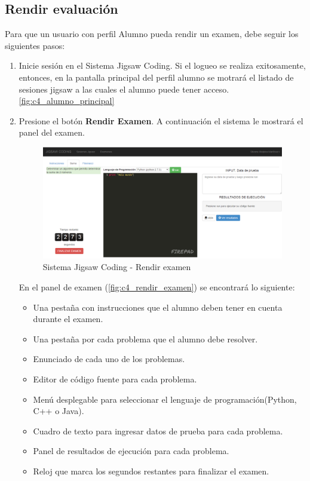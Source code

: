 \subsection{Rendir evaluación}
Para que un usuario con perfil Alumno pueda rendir un examen, debe seguir los siguientes pasos:

\begin{enumerate}
	\item Inicie sesión en el Sistema Jigsaw Coding. Si el logueo se realiza exitosamente, entonces, en la pantalla principal del perfil alumno se motrará el listado de sesiones jigsaw a las cuales el alumno puede tener acceso.\autoref{fig:c4_alumno_principal}
	\item Presione el botón \textbf{Rendir Examen}. A continuación el sistema le mostrará el panel del examen.
	
	\begin{figure}[h!]
		\centering
		\caption{Sistema Jigsaw Coding - Rendir examen}
		\label{fig:c4_rendir_examen}
		\includegraphics[scale=0.4]{figuras/usodelsistema/alumno/rendir_examen}
	\end{figure}
	
	En el panel de examen  (\autoref{fig:c4_rendir_examen}) se encontrará lo siguiente: 
	
	\begin{itemize}
		\item Una pestaña con instrucciones que el alumno deben tener en cuenta durante el examen.
		\item Una pestaña por cada problema que el alumno debe resolver.
		\item Enunciado de cada uno de los problemas.
		\item Editor de código fuente para cada problema.
		\item Menú desplegable para seleccionar el lenguaje de programación(Python, C++ o Java).
		\item Cuadro de texto para ingresar datos de prueba para cada problema.
		\item Panel de resultados de ejecución para cada problema.
		\item Reloj que marca los segundos restantes para finalizar el examen.
	\end{itemize}
	

\end{enumerate}
